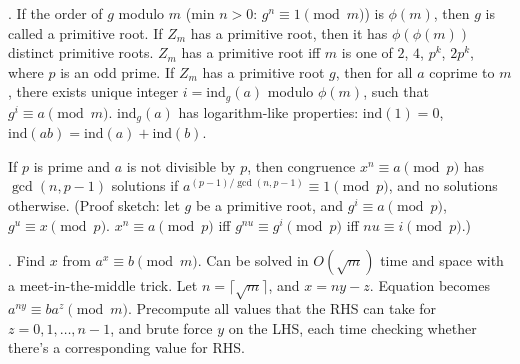 
.  If the order of $g$ modulo $m$ (min $n>0$:
$g^n \equiv 1 \pmod{m}$) is $\phi(m)$, then $g$ is called a primitive root.
If $Z_m$ has a primitive root, then it has $\phi(\phi(m))$ distinct primitive
roots. $Z_m$ has a primitive root iff $m$ is one of $2$, $4$,
$p^k$, $2p^k$, where $p$ is an odd prime.
If $Z_m$ has a primitive root $g$, then for all $a$ coprime to $m$,
there exists unique integer $i=\text{ind}_g(a)$ modulo $\phi(m)$,
such that $g^i \equiv a \pmod{m}$.
$\text{ind}_g(a)$ has logarithm-like properties:
$\text{ind}(1) = 0$, $\text{ind}(ab) = \text{ind}(a) + \text{ind}(b)$.

If $p$ is prime and $a$ is not divisible by $p$, then congruence
$x^n \equiv a \pmod{p}$ has $\gcd(n, p-1)$ solutions if
$a^{(p-1)/\gcd(n,p-1)} \equiv 1 \pmod{p}$, and no solutions otherwise.
(Proof sketch: let $g$ be a primitive root, and
$g^i \equiv a \pmod{p}$, $g^u \equiv x \pmod{p}$.
$x^n \equiv a \pmod{p}$ iff $g^{nu} \equiv g^i \pmod{p}$ iff $nu \equiv i \pmod{p}$.)

.  Find $x$ from $a^x \equiv b \pmod{m}$.
Can be solved in $O(\sqrt{m})$ time and space with a meet-in-the-middle trick.
Let $n = \lceil \sqrt{m} \rceil$, and $x = ny - z$.
Equation becomes $a^{ny} \equiv b a^z \pmod{m}$.  Precompute all values that
the RHS can take for $z = 0, 1, \dots, n-1$, and brute force $y$ on the LHS,
each time checking whether there's a corresponding value for RHS.


